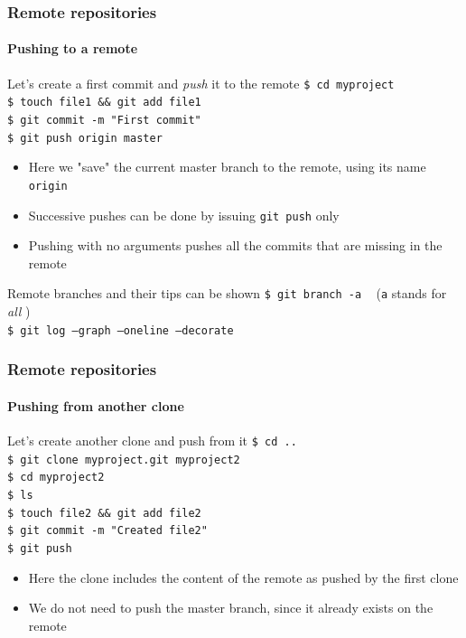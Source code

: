 \begin{frame}
\frametitle{Remote repositories}
\framesubtitle{Pushing to a remote}

\begin{block}{Let's create a first commit and {\em push} it to the remote}
\texttt{\$ cd myproject} \\
\texttt{\$ touch file1 \&\& git add file1} \\
\texttt{\$ git commit -m "First commit"} \\
\texttt{\$ git push origin master}

\begin{itemize}
\item Here we "save" the current master branch to the remote, using its name \texttt{origin}
\item Successive pushes can be done by issuing \texttt{git push} only
\item Pushing with no arguments pushes all the commits that are missing in the remote
\end{itemize}
\end{block}

\pause
\begin{block}{Remote branches and their tips can be shown}
\texttt{\$ git branch -a} \,\,\, (\texttt{a} stands for {\em all} ) \\
\texttt{\$ git log ---graph ---oneline ---decorate}
\end{block}

\end{frame}

\begin{frame}
\frametitle{Remote repositories}
\framesubtitle{Pushing from another clone}

\begin{block}{Let's create another clone and push from it}
\texttt{\$ cd ..} \\
\texttt{\$ git clone myproject.git myproject2} \\
\texttt{\$ cd myproject2} \\
\texttt{\$ ls} \\
\texttt{\$ touch file2 \&\& git add file2} \\
\texttt{\$ git commit -m "Created file2"} \\
\texttt{\$ git push}

\begin{itemize}
\item Here the clone includes the content of the remote as pushed by the first clone
\item We do not need to push the master branch, since it already exists on the remote
\end{itemize}
\end{block}

\end{frame}


